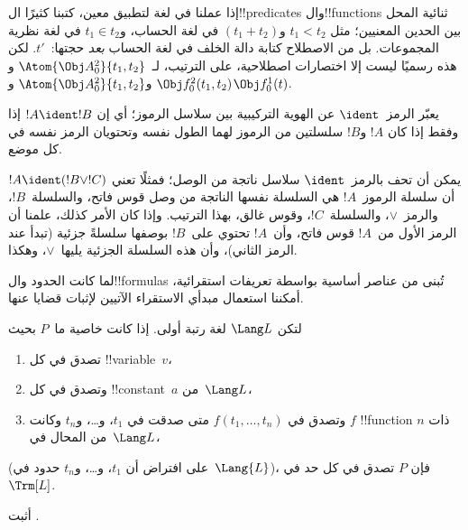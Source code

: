 \documentclass[../../../include/open-logic-section]{subfiles}
\begin{document}
إذا عملنا في لغة لتطبيق معين، كتبنا كثيرًا ال!!{predicate}s
وال!!{function}s ثنائية المحل بين الحدين المعنيين؛ مثل
$t_1 < t_2$ و$(t_1 + t_2)$ في لغة الحساب، و$t_1 \in t_2$ في لغة
نظرية المجموعات. بل من الاصطلاح كتابة دالة الخلف في لغة الحساب
\emph{بعد} حجتها:~$t'$. لكن هذه رسميًا ليست إلا اختصارات اصطلاحية،
على الترتيب، لـ~$\Atom{\Obj A^2_0}{t_1, t_2}$ و
$\Obj f^2_0(t_1, t_2)$ و$\Atom{\Obj A^2_0}{t_1, t_2}$ و$\Obj f^1_0(t)$.

\begin{defn}
يعبّر الرمز~$\ident$ عن الهوية التركيبية بين سلاسل الرموز؛ أي إن
$!A \ident !B$ إذا وفقط إذا كان $!A$ و$!B$ سلسلتين من الرموز لهما
الطول نفسه وتحتويان الرمز نفسه في كل موضع.
\end{defn}

يمكن أن تحف بالرمز~$\ident$ سلاسل ناتجة من الوصل؛ فمثلًا تعني
$!A \ident (!B \lor !C)$ أن سلسلة الرموز~$!A$ هي السلسلة نفسها الناتجة
من وصل قوس فاتح، والسلسلة~$!B$، والرمز~$\lor$، والسلسلة~$!C$، وقوس
غالق، بهذا الترتيب. وإذا كان الأمر كذلك، علمنا أن الرمز الأول من~$!A$
قوس فاتح، وأن~$!A$ تحتوي على~$!B$ بوصفها سلسلةً جزئية (تبدأ عند الرمز
الثاني)، وأن هذه السلسلة الجزئية يليها~$\lor$، وهكذا.

لما كانت الحدود وال!!{formula}s تُبنى من عناصر أساسية بواسطة تعريفات
استقرائية، أمكننا استعمال مبدأي الاستقراء الآتيين لإثبات قضايا عنها.

\begin{lem}
    لتكن $\Lang L$ لغة رتبة أولى.
    إذا كانت خاصية ما~$P$ بحيث
    \begin{enumerate}
        \item تصدق في كل !!{variable}~$v$،
        \item وتصدق في كل !!{constant}~$a$ من~$\Lang L$،
        \item وتصدق في $f(t_1,\dotsc,t_n)$ متى صدقت في
        $t_1$، و\dots، و$t_n$ وكانت $f$ !!{function} ذات $n$ من
            المحال في~$\Lang L$،
    \end{enumerate}
    (على افتراض أن $t_1$، و\dots، و$t_n$ حدود في~$\Lang{L}$)،
    فإن $P$ تصدق في كل حد في~$\Trm[L]$.
\end{lem}

\begin{prob}
    أثبت .
\end{prob}
\end{document}
